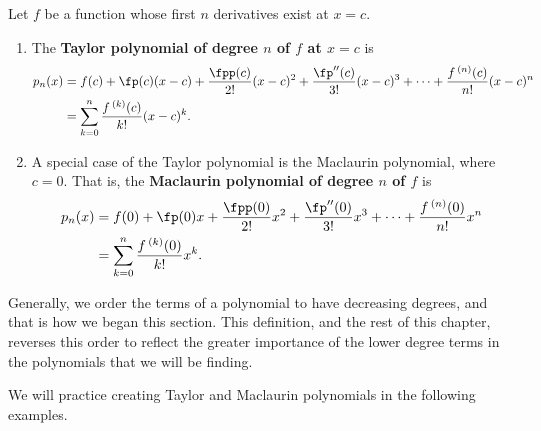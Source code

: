 \setboxwidth{100pt}
{Let $f$ be a function whose first $n$ derivatives exist at $x=c$.
 
\begin{enumerate}
	\item	The \textbf{Taylor polynomial of degree $n$ of $f$ at $x=c$} is 
	\begin{align*}
	p_n(x)
	&= f(c) + \fp(c)(x-c) + \frac{\fpp(c)}{2!}(x-c)^2+\frac{\fp''(c)}{3!}(x-c)^3+\dotsb+\frac{f\,^{(n)}(c)}{n!}(x-c)^n \\
	&=\sum_{k=0}^n\frac{f\,^{(k)}(c)}{k!}(x-c)^k.
	\end{align*}
	\item	A special case of the Taylor polynomial is the Maclaurin polynomial, where $c=0$. That is, the \textbf{Maclaurin polynomial of degree $n$ of $f$} is 
	\begin{align*}
	p_n(x)
	&= f(0) + \fp(0)x + \frac{\fpp(0)}{2!}x^2+\frac{\fp''(0)}{3!}x^3+\dotsb+\frac{f\,^{(n)}(0)}{n!}x^n \\
	&=\sum_{k=0}^n\frac{f\,^{(k)}(0)}{k!}x^k.
	\end{align*}
\end{enumerate}}

Generally, we order the terms of a polynomial to have decreasing degrees, and that is how we began this section.  This definition, and the rest of this chapter, reverses this order to reflect the greater importance of the lower degree terms in the polynomials that we will be finding.


We will practice creating Taylor and Maclaurin polynomials in the following examples.

